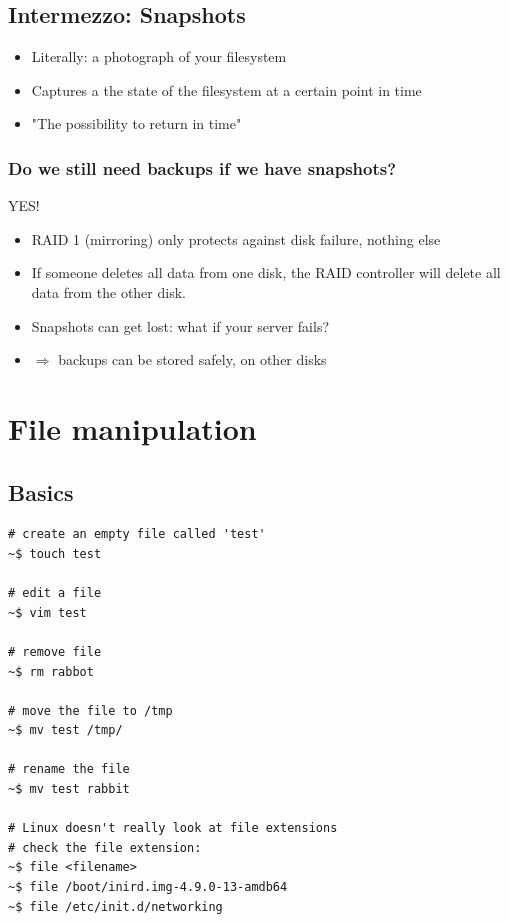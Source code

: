 \documentclass{article}
\begin{document}
\subsection{Intermezzo: Snapshots}

\begin{itemize}
    \item Literally: a photograph of your filesystem
    \item Captures a the state of the filesystem at a certain point in time
    \item "The possibility to return in time"
\end{itemize}

\subsubsection{Do we still need backups if we have snapshots?}

YES!

\begin{itemize}
    \item RAID 1 (mirroring) only protects against disk failure, nothing else
    \item If someone deletes all data from one disk, the RAID controller will delete all data from the other disk.
    \item Snapshots can get lost: what if your server fails?
    \item $\Rightarrow$ backups can be stored safely, on other disks
\end{itemize}

\section{File manipulation}

\subsection{Basics}

\begin{verbatim}
# create an empty file called 'test'
~$ touch test

# edit a file
~$ vim test

# remove file
~$ rm rabbot

# move the file to /tmp
~$ mv test /tmp/

# rename the file
~$ mv test rabbit

# Linux doesn't really look at file extensions
# check the file extension:
~$ file <filename>
~$ file /boot/inird.img-4.9.0-13-amdb64
~$ file /etc/init.d/networking
\end{verbatim}
\end{document}
